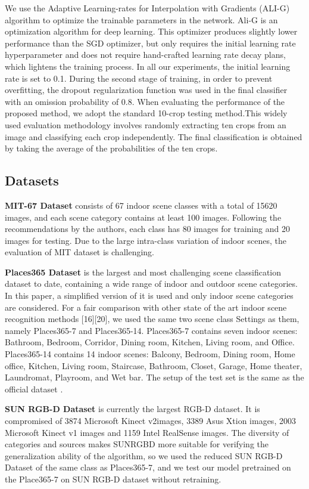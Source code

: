 \documentclass[conference]{IEEEtran}
\begin{document}
We use the Adaptive Learning-rates for Interpolation with Gradients (ALI-G) \cite{ref31} algorithm to optimize the trainable parameters in the network. Ali-G is an optimization algorithm for deep learning. This optimizer produces slightly lower performance than the SGD optimizer, but only requires the initial learning rate hyperparameter and does not require hand-crafted learning rate decay plans, which lightens the training process. In all our experiments, the initial learning rate is set to 0.1. During the second stage of training, in order to prevent overfitting, the dropout regularization function was used in the final classifier with an omission probability of 0.8. When evaluating the performance of the proposed method, we adopt the standard 10-crop testing method\cite{ref33}.This widely used evaluation methodology involves randomly extracting ten crops from an image and classifying each crop independently. The final classification is obtained by taking the average of the probabilities of the ten crops.

\subsection{Datasets}

\textbf{MIT-67 Dataset }\cite{ref8} consists of 67 indoor scene classes with a total of 15620 images, and each scene category contains at least 100 images. Following the recommendations by the authors\cite{ref8}, each class has 80 images for training and 20 images for testing. Due to the large intra-class variation of indoor scenes, the evaluation of MIT dataset is challenging.

\textbf{Places365 Dataset} \cite{ref14} is the largest and most challenging scene classification dataset to date, containing a wide range of indoor and outdoor scene categories. In this paper, a simplified version of it is used and only indoor scene categories are considered. For a fair comparison with other state of the art indoor scene recognition methods [16][20], we used the same two scene class Settings as them, namely Places365-7 and Places365-14. Places365-7 contains seven indoor scenes: Bathroom, Bedroom, Corridor, Dining room, Kitchen, Living room, and Office. Places365-14 contains 14 indoor scenes: Balcony, Bedroom, Dining room, Home office, Kitchen, Living room, Staircase, Bathroom, Closet, Garage, Home theater, Laundromat, Playroom, and Wet bar. The setup of the test set is the same as the official dataset \cite{ref14}.

\textbf{SUN RGB-D Dataset} \cite{ref30} is currently the largest RGB-D dataset. It is compromised of 3874 Microsoft Kinect v2images, 3389 Asus Xtion images, 2003 Microsoft Kinect v1 images and 1159 Intel RealSense images. The diversity of categories and sources makes SUNRGBD more suitable for verifying the generalization ability of the algorithm, so we used the reduced SUN RGB-D Dataset of the same class as Places365-7, and we test our model pretrained on the Place365-7 on SUN RGB-D dataset without retraining.
\end{document}

